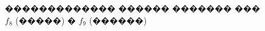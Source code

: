\documentclass[a4paper]{article}
\begin{document}
\begin{figure}[h]
\begin{minipage}[h]{0.49\linewidth}
  \end{minipage}
  \caption{������������� ������ ������� ��� $f_8$ (�����) � $f_9$ (������)}
  \label{ris:image1}
\end{figure}

\begin{figure}[h]
  \begin{minipage}[h]{0.49\linewidth}
  \end{minipage}
  \hfill
  \begin{minipage}[h]{0.49\linewidth}

\end{minipage}
\end{figure}
\end{document}
